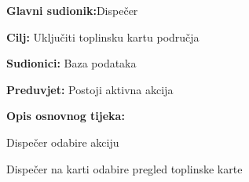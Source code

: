 	    		\noindent {}
	    		\begin{packed_item}
	    			
	    			\item \textbf{Glavni sudionik:}Dispečer
	    			\item  \textbf{Cilj:} Uključiti toplinsku kartu područja
	    			\item  \textbf{Sudionici:} Baza podataka
	    			\item  \textbf{Preduvjet:} Postoji aktivna akcija
	    			\item  \textbf{Opis osnovnog tijeka:}
	    			
	    			\item[] \begin{packed_enum}
	    				
	    				\item Dispečer odabire akciju
	    				\item Dispečer na karti odabire pregled toplinske karte
	    			\end{packed_enum}
	    		\end{packed_item}
    		\newpage	
    			\noindent {}
